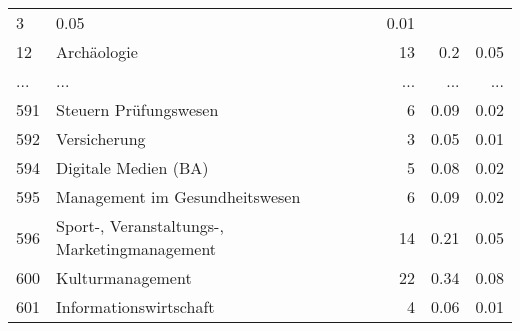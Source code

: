 \begin{longtable}{lXrrr}
          \num{3} &
          \num[round-mode=places,round-precision=2]{0.05} &
          \num[round-mode=places,round-precision=2]{0.01} \\
        12 & \multicolumn{1}{X}{Archäologie} & %
          \num{13} &
          \num[round-mode=places,round-precision=2]{0.2} &
          \num[round-mode=places,round-precision=2]{0.05} \\
       ... & ... & ... & ... & ... \\
        591 & \multicolumn{1}{X}{Steuern Prüfungswesen} & %
          \num{6} &
          \num[round-mode=places,round-precision=2]{0.09} &
          \num[round-mode=places,round-precision=2]{0.02} \\

        592 & \multicolumn{1}{X}{Versicherung} & %
          \num{3} &
          \num[round-mode=places,round-precision=2]{0.05} &
          \num[round-mode=places,round-precision=2]{0.01} \\

        594 & \multicolumn{1}{X}{Digitale Medien (BA)} & %
          \num{5} &
          \num[round-mode=places,round-precision=2]{0.08} &
          \num[round-mode=places,round-precision=2]{0.02} \\

        595 & \multicolumn{1}{X}{Management im Gesundheitswesen} & %
          \num{6} &
          \num[round-mode=places,round-precision=2]{0.09} &
          \num[round-mode=places,round-precision=2]{0.02} \\

        596 & \multicolumn{1}{X}{Sport-, Veranstaltungs-, Marketingmanagement} & %
          \num{14} &
          \num[round-mode=places,round-precision=2]{0.21} &
          \num[round-mode=places,round-precision=2]{0.05} \\

        600 & \multicolumn{1}{X}{Kulturmanagement} & %
          \num{22} &
          \num[round-mode=places,round-precision=2]{0.34} &
          \num[round-mode=places,round-precision=2]{0.08} \\

        601 & \multicolumn{1}{X}{Informationswirtschaft} & %
          \num{4} &
          \num[round-mode=places,round-precision=2]{0.06} &
          \num[round-mode=places,round-precision=2]{0.01} \\


\end{longtable}

